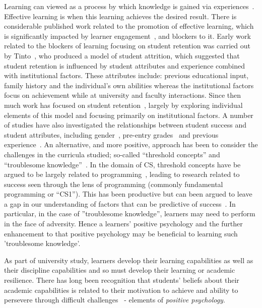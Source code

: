 \documentclass[sigconf]{acmart}
\begin{document}
Learning can viewed as a process by which knowledge is gained via experiences~\cite{kolb2014}. Effective learning is when this learning achieves the desired result. There is considerable published work related to the promotion of effective learning, which is significantly impacted by learner engagement~\cite{kolb2014}, and blockers to it. Early work related to the blockers of learning focusing on student retention was carried out by Tinto~\cite{Tinto1975}, who produced a model of student attrition, which suggested that student retention is influenced by student attributes and experience combined with institutional factors. These attributes include: previous educational input, family history and the individual's own abilities whereas the institutional factors focus on achievement while at university and faculty interactions. Since then much work has focused on student retention~\cite{Barbera2017,Chen2012}, largely by exploring individual elements of this model and focusing primarily on institutional factors. A number of studies have also investigated the relationships between student success and student attributes, including gender~\cite{Lishinski:2016:LPG:2960310.2960329}, pre-entry grades~\cite{Peterson1979} and previous experience~\cite{Ramalingam:2004:SMM:1026487.1008042}. 
An alternative, and more positive, approach has been to consider the challenges in the curricula studied; so-called ``threshold concepts'' and ``troublesome knowledge''~\cite{Land2012}. In the domain of CS, threshold concepts have be argued to be largely related to programming~\cite{Sanders:2016:TCC:2999541.2999546}, leading to research related to success seen through the lens of programming (commonly fundamental programming or ``CS1''). This has been productive but can been argued to leave a gap in our understanding of factors that can be predictive of success~\cite{Liao:2019:EVD:3287324.3287407,Liao:2016:LEI:2960310.2960315,Castro-Wunsch:2017:ENN:3017680.3017792,Quille:2018:PPS:3197091.3197101}. In particular, in the case of ''troublesome knowledge'', learners may need to perform in the face of adversity. Hence a learners' positive psychology and the further enhancement to that positive psychology may be beneficial to learning such 'troublesome knowledge'.

As part of university study, learners develop their learning capabilities as well as their discipline capabilities and so must develop their learning or academic resilience.  There has long been recognition that students' beliefs about their academic capabilities is related to their motivation to achieve and ability to persevere through difficult challenges~\cite{ZIMMERMAN200082,Bandura1977} - elements of {\em positive psychology}.
 
\end{document}
